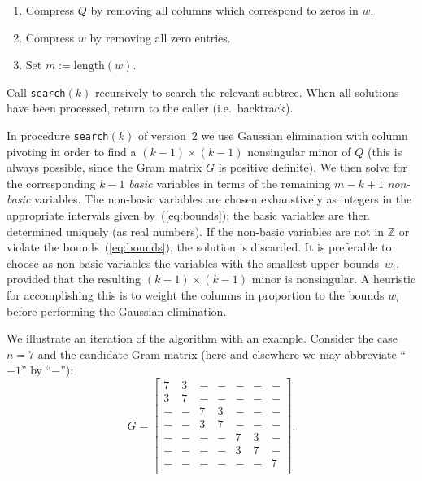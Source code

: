 \documentclass[11pt,a4paper]{article}
\newcommand{\integer}{\mathbb{Z}}
\begin{document}
\begin{enumerate}
\begin{enumerate}
\item Compress $Q$ by removing all columns which correspond to zeros in $w$.
\item Compress $w$ by removing all zero entries.
\item Set $m := \text{length}(w)$.
\end{enumerate}
Call {\tt search}$(k)$ recursively to search the relevant subtree.
When all solutions have been processed, return to the caller
(i.e.~backtrack).
\end{enumerate}

\noindent In procedure {\tt search}$(k)$ of version~2 we use
Gaussian elimination with column pivoting in order
to find a $(k-1)\times (k-1)$ nonsingular minor of $Q$
(this is always possible, since the Gram matrix $G$ is positive definite). 
We then solve for the
corresponding $k-1$ \emph{basic} variables in terms of the remaining
$m-k+1$ \emph{non-basic} variables. The non-basic variables are chosen
exhaustively as integers in the appropriate intervals given
by~(\ref{eq:bounds}); 
the basic variables are then determined uniquely (as real
numbers).  If the non-basic variables are not in $\integer$
or violate the bounds~(\ref{eq:bounds}), the solution is discarded.
It is preferable
to choose as non-basic variables the variables with the smallest
upper bounds~$w_i$, provided that the resulting $(k-1)\times (k-1)$ 
minor is nonsingular. 
A heuristic for accomplishing this is to weight
the columns in proportion to the bounds $w_i$ before performing the Gaussian
elimination.

We illustrate an iteration of the algorithm with an example. 
Consider the case $n=7$ and the candidate Gram matrix
(here and elsewhere we may abbreviate ``$-1$'' by ``$-$''):
\[G = \left[\begin{matrix}
7& 3&-&-&-&-&-\\
 3& 7& -& -& -& -& -\\
-& -& 7& 3& -& -& -\\
-& -& 3& 7& -& -& -\\
-& -& -& -& 7& 3& -\\
-& -& -& -& 3& 7& -\\
-& -& -& -& -& -& 7\\
\end{matrix}\right].\]
\end{document}
